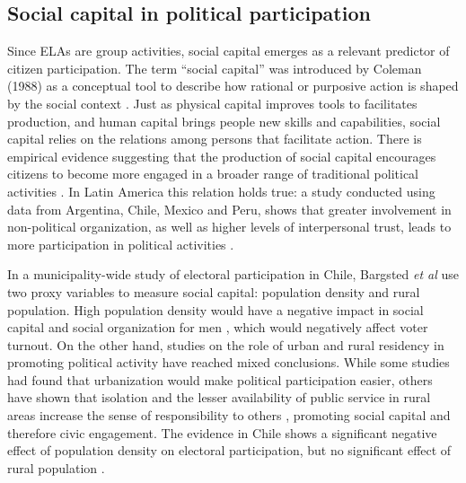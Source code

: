 \documentclass[onecolumn]{article}
\begin{document}

\subsection{Social capital in political participation}\label{SN4}

Since ELAs are group activities, social capital emerges as a relevant predictor of citizen participation. The term ``social capital'' was introduced by Coleman (1988) as a conceptual tool to describe how rational or purposive action is shaped by the social context \cite{coleman1988}. Just as physical capital improves tools to facilitates production, and human capital brings people new skills and capabilities, social capital relies on the relations among persons that facilitate action. There is empirical evidence suggesting that the production of social capital encourages citizens to become more engaged in a broader range of traditional political activities \cite{ladua}. In Latin America this relation holds true: a study conducted using data from Argentina, Chile, Mexico and Peru, shows that greater involvement in non-political organization, as well as higher levels of interpersonal trust, leads to more participation in political activities \cite{klesner}. 

In a municipality-wide study of electoral participation in Chile, Bargsted \textit{et al} \cite{bargsted} use two proxy variables to measure social capital: population density and rural population. High population density would have a negative impact in social capital and social organization for men \cite{mccull}, which would negatively affect voter turnout. On the other hand, studies on the role of urban and rural residency in promoting political activity have reached mixed conclusions. While some studies had found that urbanization would make political participation easier,\cite{campbell,muller1970} others have shown that isolation and the lesser availability of public service in rural areas increase the sense of responsibility to others \cite{hofferth}, promoting social capital and therefore civic engagement. The evidence in Chile shows a significant negative effect of population density on electoral participation, but no significant effect of rural population \cite{bargsted}.
\end{document}
